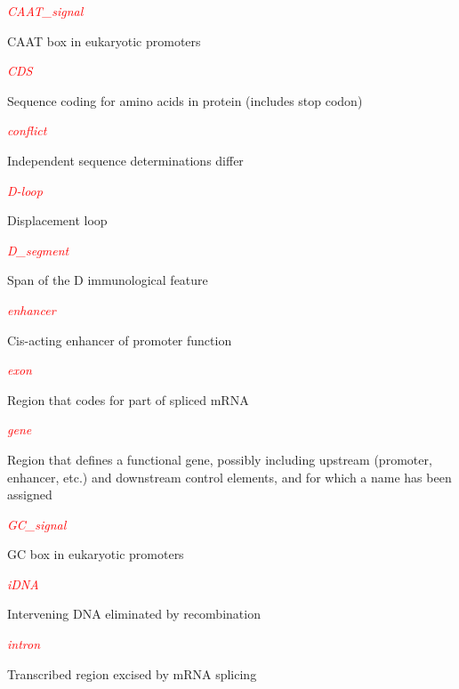\textcolor{red}{\textit{CAAT\_signal}}
\begin{adjustwidth}{1cm}{}
CAAT box in eukaryotic promoters
\end{adjustwidth}

\textcolor{red}{\textit{CDS}}
\begin{adjustwidth}{1cm}{}
Sequence coding for amino acids in protein (includes stop codon)
\end{adjustwidth}

\textcolor{red}{\textit{conflict}}
\begin{adjustwidth}{1cm}{}
Independent sequence determinations differ
\end{adjustwidth}

\textcolor{red}{\textit{D-loop}}
\begin{adjustwidth}{1cm}{}
Displacement loop
\end{adjustwidth}

\textcolor{red}{\textit{D\_segment}}
\begin{adjustwidth}{1cm}{}
Span of the D immunological feature
\end{adjustwidth}

\textcolor{red}{\textit{enhancer}}
\begin{adjustwidth}{1cm}{}
Cis-acting enhancer of promoter function
\end{adjustwidth}

\textcolor{red}{\textit{exon}}
\begin{adjustwidth}{1cm}{}
Region that codes for part of spliced mRNA
\end{adjustwidth}

\textcolor{red}{\textit{gene}}
\begin{adjustwidth}{1cm}{}
Region that defines a functional gene, possibly including upstream (promoter, enhancer, etc.) and downstream control elements, and for which a name has been assigned
\end{adjustwidth}

\textcolor{red}{\textit{GC\_signal}}
\begin{adjustwidth}{1cm}{}
GC box in eukaryotic promoters
\end{adjustwidth}

\textcolor{red}{\textit{iDNA}}
\begin{adjustwidth}{1cm}{}
Intervening DNA eliminated by recombination
\end{adjustwidth}

\textcolor{red}{\textit{intron}}
\begin{adjustwidth}{1cm}{}
Transcribed region excised by mRNA splicing
\end{adjustwidth}

